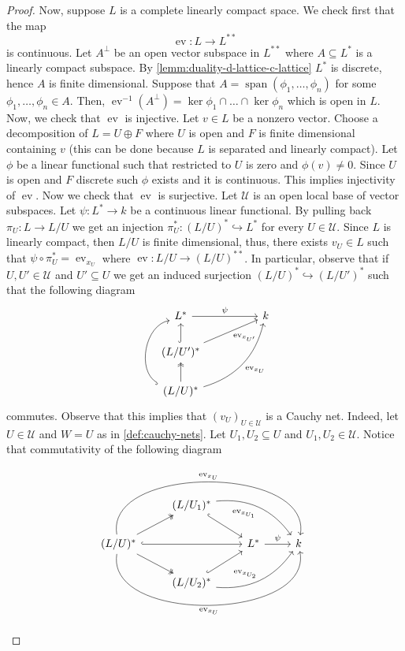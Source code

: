 \begin{proof}
	Now, suppose $L$ is a complete linearly compact space. We check first that the map 
	\[
		\operatorname{ev}\colon L \to L^{**}
	\]
	is continuous. Let $A^{\perp}$ be an open vector subspace in $L^{**}$ where $A \subseteq L^{*}$ is a linearly compact subspace. By \cref{lemm:duality-d-lattice-c-lattice} $L^{*}$ is discrete, hence $A$ is finite dimensional. Suppose that $A = \operatorname{span}(\phi_{1},\ldots,\phi_{n})$ for some $\phi_{1},\ldots,\phi_{n} \in A$. Then, $\operatorname{ev}^{-1}(A^{\perp}) = \ker \phi_{1} \cap \ldots \cap \ker \phi_{n}$ which is open in $L$. Now, we check that $\operatorname{ev}$ is injective. Let $v \in L$ be a nonzero vector. Choose a decomposition of $L = U \oplus F$ where $U$ is open and $F$ is finite dimensional containing $v$ (this can be done because $L$ is separated and linearly compact). Let $\phi$ be a linear functional such that restricted to $U$ is zero and $\phi(v) \neq 0$. Since $U$ is open and $F$ discrete such $\phi$ exists and it is continuous. This implies injectivity of $\operatorname{ev}$.  Now we check that $\operatorname{ev}$ is surjective. Let $\mathscr{U}$ is an open local base of vector subspaces. Let $\psi\colon L^{*} \to k$ be a continuous linear functional. By pulling back $\pi_{U}\colon L \to L/U$ we get an injection $\pi_{U}^{*}\colon(L/U)^{*} \hookrightarrow L^{*}$ for every $U \in \mathscr{U}$. Since $L$ is linearly compact, then $L/U$ is finite dimensional, thus, there exists $v_{U}\in L$ such that $\psi \circ \pi_{U}^{*} = \operatorname{ev}_{x_{U}}$ where $\operatorname{ev}\colon L/U \to (L/U)^{**}$. In particular, observe that if $U,U' \in \mathscr{U}$ and $U' \subseteq U$ we get an induced surjection $(L/U)^{*} \hookrightarrow (L/U')^{*}$ such that the following diagram
	\[
	\begin{tikzcd}
		L^{*} \arrow[rr, "\psi"] & & k \\
		(L/U')^{*} \arrow[u, hook] \arrow[urr, swap, "\operatorname{ev}_{x_{U'}}"] & & \\
		(L/U)^{*} \arrow[u, two heads] \arrow[uurr, swap, bend right, "\operatorname{ev}_{x_{U}}"] \arrow[uu, bend left = 70, hook]& & 
	\end{tikzcd}
	\]
	commutes. Observe that this implies that $(v_{U})_{U\in \mathscr{U}}$ is a Cauchy net. Indeed, let $U \in \mathscr{U}$ and $W = U$ as in \cref{def:cauchy-nets}. Let $U_{1}, U_{2} \subseteq U$ and $U_{1}, U_{2}\in\mathscr{U}$. Notice that commutativity of the following diagram 
	\[
		\begin{tikzcd}
			& (L/U_{1})^{*}\ar[dr, swap, hook] \ar[rrd, "\operatorname{ev}_{x_{U_{1}}}", bend left, swap] & & \\
			(L/U)^{*} \ar[rrr, bend left = 100, "\operatorname{ev}_{x_{U}}"]\ar[rrr, swap, bend right= 100, "\operatorname{ev}_{x_{U}}"]  \ar[ur, two heads] \ar[dr, two heads] \ar[rr, hook] & & L^{*} \ar[r, "\psi"] & k \\
			& (L/U_{2})^{*}\ar[ur, hook] \ar[rru, "\operatorname{ev}_{x_{U_{2}}}", bend right] & & 
		\end{tikzcd}
	\]


\end{proof}
